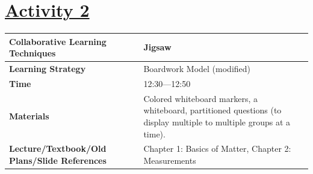 \documentclass{article}
\begin{document}
\noindent
\section*{\underline{Activity 2}}
\begin{tabular}{|p{4.5cm}|p{9.5cm}|}
\hline
\textbf{Collaborative Learning Techniques} & Jigsaw \\
\hline
\textbf{Learning Strategy} &  Boardwork Model (modified)\\
\hline
\textbf{Time} & 12:30---12:50\\
\hline
\textbf{Materials} & Colored whiteboard markers, a whiteboard, partitioned questions (to display multiple to multiple groups at a time).\\
\hline
\textbf{Lecture/Textbook/Old Plans/Slide References} & Chapter 1: Basics of Matter, Chapter 2: Measurements\\
\hline
\end{tabular}
\end{document}
